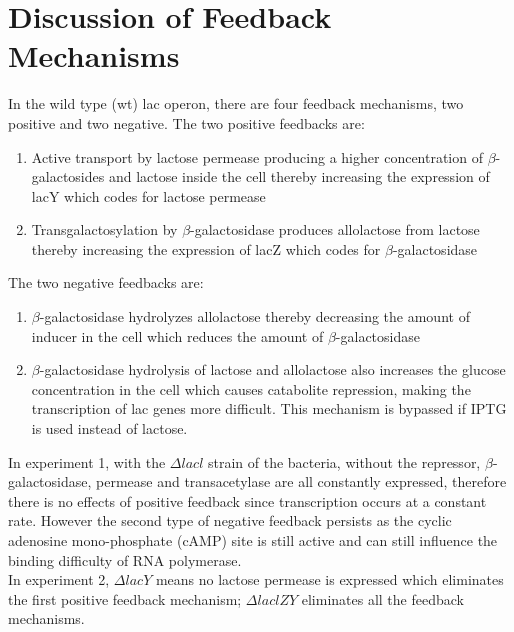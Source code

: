 \documentclass{article}
\begin{document}
\section{Discussion of Feedback Mechanisms}
In the wild type (wt) lac operon, there are four feedback mechanisms, two positive and two negative. The two positive feedbacks are:
\begin{enumerate}
  \item Active transport by lactose permease producing a higher concentration of $\beta$-galactosides and lactose inside the cell thereby increasing the expression of lacY which codes for lactose permease
  \item Transgalactosylation by $\beta$-galactosidase produces allolactose from lactose thereby increasing the expression of lacZ which codes for $\beta$-galactosidase
\end{enumerate}
The two negative feedbacks are:
\begin{enumerate}
  \item $\beta$-galactosidase hydrolyzes allolactose thereby decreasing the amount of inducer in the cell which reduces the amount of $\beta$-galactosidase
  \item $\beta$-galactosidase hydrolysis of lactose and allolactose also increases the glucose concentration in the cell which causes catabolite repression, making the transcription of lac genes more difficult. This mechanism is bypassed if IPTG is used instead of lactose.
\end{enumerate}
In experiment 1, with the $\Delta lacl$ strain of the bacteria, without the repressor, $\beta$-galactosidase, permease and transacetylase are all constantly expressed, therefore there is no effects of positive feedback since transcription occurs at a constant rate. However the second type of negative feedback persists as the cyclic adenosine mono-phosphate (cAMP) site is still active and can still influence the binding difficulty of RNA polymerase.\\
In experiment 2, $\Delta lacY$ means no lactose permease is expressed which eliminates the first positive feedback mechanism; $\Delta laclZY$ eliminates all the feedback mechanisms.
\end{document}
